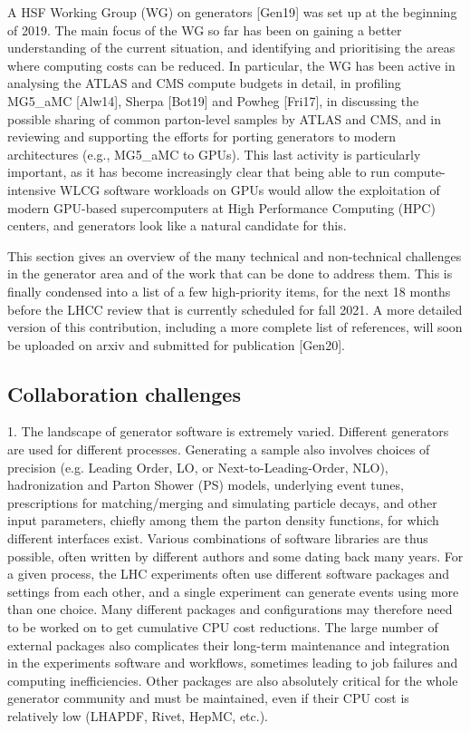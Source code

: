 \documentclass[10pt,a4paper]{article}
\begin{document}
A HSF Working Group (WG) on generators {[}Gen19{]} was set up at the
beginning of 2019. The main focus of the WG so far has been on gaining a
better understanding of the current situation, and identifying and
prioritising the areas where computing costs can be reduced. In
particular, the WG has been active in analysing the ATLAS and CMS
compute budgets in detail, in profiling MG5\_aMC {[}Alw14{]}, Sherpa
{[}Bot19{]} and Powheg {[}Fri17{]}, in discussing the possible sharing
of common parton-level samples by ATLAS and CMS, and in reviewing and
supporting the efforts for porting generators to modern architectures
(e.g., MG5\_aMC to GPUs). This last activity is particularly important,
as it has become increasingly clear that being able to run
compute-intensive WLCG software workloads on GPUs would allow the
exploitation of modern GPU-based supercomputers at High Performance
Computing (HPC) centers, and generators look like a natural candidate
for this.

This section gives an overview of the many technical and non-technical
challenges in the generator area and of the work that can be done to
address them. This is finally condensed into a list of a few
high-priority items, for the next 18 months before the LHCC review that
is currently scheduled for fall 2021. A more detailed version of this
contribution, including a more complete list of references, will soon be
uploaded on arxiv and submitted for publication {[}Gen20{]}.

\hypertarget{collaboration-challenges}{%
\subsection{Collaboration challenges}\label{collaboration-challenges}}

1. {The landscape of generator software is extremely varied}. Different
generators are used for different processes. Generating a sample also
involves choices of precision (e.g. Leading Order, LO, or
Next-to-Leading-Order, NLO), hadronization and Parton Shower (PS)
models, underlying event tunes, prescriptions for matching/merging and
simulating particle decays, and other input parameters, chiefly among
them the parton density functions, for which different interfaces exist.
Various combinations of software libraries are thus possible, often
written by different authors and some dating back many years. For a
given process, the LHC experiments often use different software packages
and settings from each other, and a single experiment can generate
events using more than one choice. Many different packages and
configurations may therefore need to be worked on to get cumulative CPU
cost reductions. The large number of external packages also complicates
their long-term maintenance and integration in the experiments software
and workflows, sometimes leading to job failures and computing
inefficiencies. Other packages are also absolutely critical for the
whole generator community and must be maintained, even if their CPU cost
is relatively low (LHAPDF, Rivet, HepMC, etc.).
\end{document}

